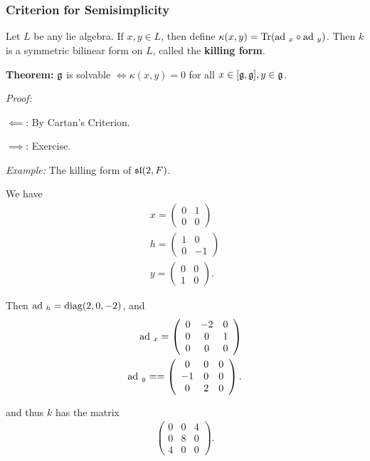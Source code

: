 \hypertarget{criterion-for-semisimplicity}{%
\subsubsection{Criterion for
Semisimplicity}\label{criterion-for-semisimplicity}}

Let \(L\) be any lie algebra. If \(x,y \in L\), then define
\(\kappa(x, y) = \mathrm{Tr}(\mathrm{ad}~_x \circ \mathrm{ad}~_y)\). Then \(k\) is a symmetric
bilinear form on \(L\), called the \textbf{killing form}.

\textbf{Theorem:} \({\mathfrak{g}}\) is solvable \(\iff \kappa(x, y) = 0\) for
all \(x\in [{\mathfrak{g}}, {\mathfrak{g}}], y\in {\mathfrak{g}}\).

\emph{Proof:}

\(\impliedby\): By Cartan's Criterion.

\(\implies\): Exercise.

\emph{Example:} The killing form of \({\mathfrak{sl}}(2, F)\).

We have \begin{align*}
x = \left(\begin{array}{ll}{0} & {1} \\ {0} & {0}\end{array}\right) \\
h = \left(\begin{array}{rr}
1 & 0 \\
0 & -1
\end{array}\right) \\
y = \left(\begin{array}{rr}
0 & 0 \\
1 & 0
\end{array}\right)
.\end{align*}

Then \(\mathrm{ad}~_h = \mathrm{diag}(2, 0, -2)\), and \begin{align*}
\mathrm{ad}~_x = \left(\begin{array}{ccc}{0} & {-2} & {0} \\ {0} & {0} & {1} \\ {0} & {0} & {0}\end{array}\right) \\
\mathrm{ad}~_y = =\left(\begin{array}{ccc}{0} & {0} & {0} \\ {-1} & {0} & {0} \\ {0} & {2} & {0}\end{array}\right)
.\end{align*}

and thus \(k\) has the matrix \begin{align*}
\left(\begin{array}{lll}{0} & {0} & {4} \\ {0} & {8} & {0} \\ {4} & {0} & {0}\end{array}\right)
.\end{align*}

